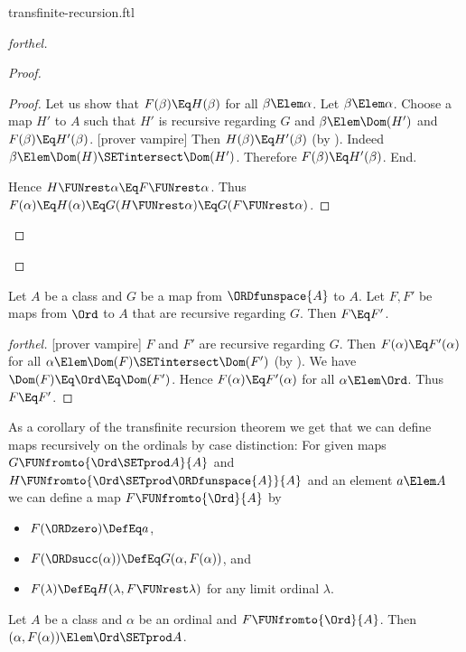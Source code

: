 \documentclass{stex}
\begin{document}
\begin{smodule}{transfinite-recursion.ftl}
\begin{proof}[forthel]
\begin{proof}
\begin{proof}
      Let us show that $F(\beta) \Eq H(\beta)$ for all $\beta \Elem \alpha$.
        Let $\beta \Elem \alpha$.
        Choose a map $H'$ to $A$ such that $H'$ is recursive regarding $G$ and $\beta \Elem \Dom(H')$ and $F(\beta) \Eq H'(\beta)$.
        [prover vampire]
        Then $H(\beta) \Eq H'(\beta)$ (by ).
        Indeed $\beta \Elem \Dom(H) \SETintersect \Dom(H')$.
        Therefore $F(\beta) \Eq H'(\beta)$.
      End.

      Hence $H \FUNrest \alpha \Eq F \FUNrest \alpha$.
      Thus $F(\alpha)
        \Eq H(\alpha)
        \Eq G(H \FUNrest \alpha)
        \Eq G(F \FUNrest \alpha)$.
    \end{proof}
  \end{proof}
\end{proof}

\begin{theorem}[forthel,title=Transfinite Recursion: Uniqueness]
  Let $A$ be a class and $G$ be a map from $\ORDfunspace{A}$ to $A$.
  Let $F, F'$ be maps from $\Ord$ to $A$ that are recursive regarding $G$.
  Then $F \Eq F'$.
\end{theorem}
\begin{proof}[forthel]
  [prover vampire]
  $F$ and $F'$ are recursive regarding $G$.
  Then $F(\alpha) \Eq F'(\alpha)$ for all $\alpha \Elem \Dom(F) \SETintersect \Dom(F')$ (by ).
  We have $\Dom(F) \Eq \Ord \Eq \Dom(F')$.
  Hence $F(\alpha) \Eq F'(\alpha)$ for all $\alpha \Elem \Ord$.
  Thus $F \Eq F'$.
\end{proof}

As a corollary of the transfinite recursion theorem we get that we can
define maps recursively on the ordinals by case distinction:
For given maps $G \FUNfromto{\Ord \SETprod A}{A}$ and
$H \FUNfromto{\Ord \SETprod \ORDfunspace{A}}{A}$ and an element $a \Elem A$ we
can define a map $F \FUNfromto{\Ord}{A}$ by
\begin{itemize}
  \item $F(\ORDzero) \DefEq a$,
  \item $F(\ORDsucc(\alpha)) \DefEq G(\alpha, F(\alpha))$, and
  \item $F(\lambda) \DefEq H(\lambda, F \FUNrest \lambda)$
    for any limit ordinal $\lambda$.
\end{itemize}

\begin{lemma}[forthel]
  Let $A$ be a class and $\alpha$ be an ordinal and $F \FUNfromto{\Ord}{A}$.
  Then $(\alpha, F(\alpha)) \Elem \Ord \SETprod A$.
\end{lemma}


\end{smodule}
\end{document}
